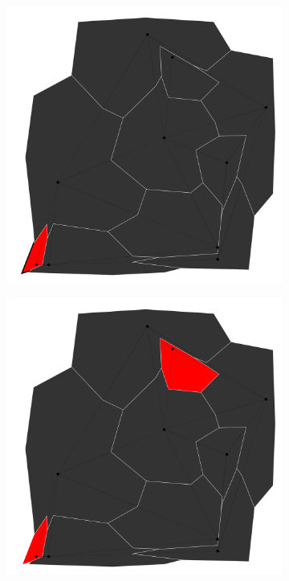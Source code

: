 \documentclass{article}
\begin{document}
		\begin{figure}[h!]
			\begin{subfigure}{0.18\textwidth}
				\centering
				\includegraphics[width=\textwidth]{images/sequences/simple_backtracking/bt_simple_I00001}
				\caption{}
				\label{bta}
			\end{subfigure}
			\;
			\begin{subfigure}{0.18\textwidth}
				\centering
				\includegraphics[width=\textwidth]{images/sequences/simple_backtracking/bt_simple_I00002}

\end{subfigure}
\end{figure}
\end{document}
